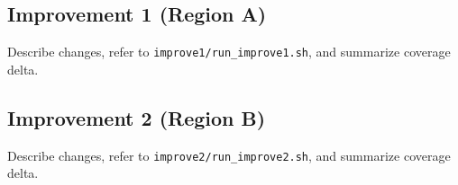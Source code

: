 \subsection{Improvement 1 (Region A)}
Describe changes, refer to \texttt{improve1/run\_improve1.sh}, and summarize coverage delta.

\subsection{Improvement 2 (Region B)}
Describe changes, refer to \texttt{improve2/run\_improve2.sh}, and summarize coverage delta.

